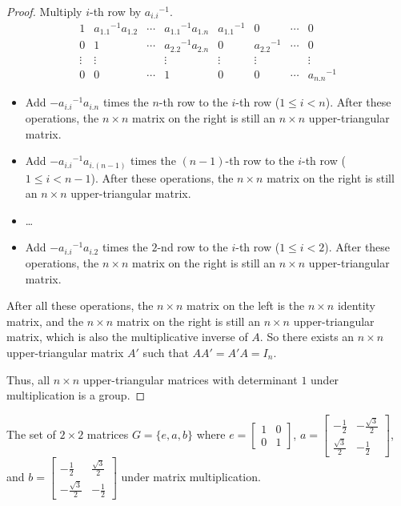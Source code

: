 \begin{proof}
    Multiply $i$-th row by ${a_{i.i}}^{-1}$.
    \[
        \begin{array}{cccc|cccc}
            1      & {a_{1.1}}^{-1}a_{1.2} & \cdots & {a_{1.1}}^{-1}a_{1.n} & {a_{1.1}}^{-1} & 0              & \cdots & 0              \\
            0      & 1                     & \cdots & {a_{2.2}}^{-1}a_{2.n} & 0              & {a_{2.2}}^{-1} & \cdots & 0              \\
            \vdots & \vdots                &        & \vdots                & \vdots         & \vdots         &        & \vdots         \\
            0      & 0                     & \cdots & 1                     & 0              & 0              & \cdots & {a_{n.n}}^{-1}
        \end{array}
    \]
    \begin{itemize}
        \item Add $-{a_{i.i}}^{-1}a_{i.n}$ times the $n$-th row to the $i$-th row ($1\le i < n$). After these operations, the $n\times n$ matrix on the right is still an $n\times n$ upper-triangular matrix.
        \item Add $-{a_{i.i}}^{-1}a_{i.(n-1)}$ times the $(n-1)$-th row to the $i$-th row ($1\le i < n-1$). After these operations, the $n\times n$ matrix on the right is still an $n\times n$ upper-triangular matrix.
        \item \ldots
        \item Add $-{a_{i.i}}^{-1}a_{i.2}$ times the $2$-nd row to the $i$-th row ($1\le i < 2$). After these operations, the $n\times n$ matrix on the right is still an $n\times n$ upper-triangular matrix.
    \end{itemize}

    After all these operations, the $n\times n$ matrix on the left is the $n\times n$ identity matrix, and the $n\times n$ matrix on the right is still an $n\times n$ upper-triangular matrix, which is also the multiplicative inverse of $A$. So there exists an $n\times n$ upper-triangular matrix $A'$ such that $AA' = A'A = I_{n}$.

    Thus, all $n\times n$ upper-triangular matrices with determinant $1$ under multiplication is a group.
\end{proof}

\newpage
\begin{exercise}
    The set of $2\times 2$ matrices $G = \{ e, a, b \}$ where $e = \begin{bmatrix}1 & 0 \\ 0 & 1\end{bmatrix}$, $a = \begin{bmatrix}-\frac{1}{2} & -\frac{\sqrt{3}}{2} \\ \frac{\sqrt{3}}{2} & -\frac{1}{2}\end{bmatrix}$, and $b = \begin{bmatrix}-\frac{1}{2} & \frac{\sqrt{3}}{2} \\ -\frac{\sqrt{3}}{2} & -\frac{1}{2}\end{bmatrix}$ under matrix multiplication.
\end{exercise}

